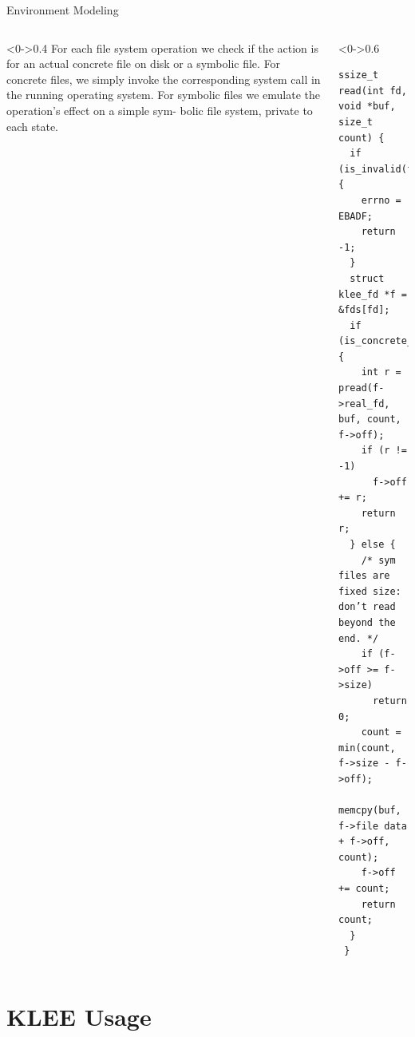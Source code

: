 \documentclass[9pt,aspectratio=43,mathserif,table]{beamer}
\begin{document}
\begin{frame}[fragile]{Environment Modeling}
	\begin{columns}[T]
		\begin{column}<0->{0.4\textwidth}
			For each file system operation we check if the action is
			for an actual concrete file on disk or a symbolic file. For
			concrete files, we simply invoke the corresponding system
			call in the running operating system. For symbolic
			files we emulate the operation’s effect on a simple sym-
			bolic file system, private to each state.
		\end{column}
		\hfill
		\begin{column}<0->{0.6\textwidth}
			\begin{lstlisting}
ssize_t read(int fd, void *buf, size_t count) {
  if (is_invalid(fd)) {
    errno = EBADF;
    return -1;
  }
  struct klee_fd *f = &fds[fd];
  if (is_concrete_file(f)) {
    int r = pread(f->real_fd, buf, count, f->off);
    if (r != -1)
      f->off += r;
    return r;
  } else {
    /* sym files are fixed size: don’t read beyond the end. */
    if (f->off >= f->size)
      return 0;
    count = min(count, f->size - f->off);
    memcpy(buf, f->file data + f->off, count);  
    f->off += count;
    return count;
  }
 }
      \end{lstlisting}
		\end{column}
	\end{columns}
\end{frame}

	

\section{KLEE Usage}
\end{document}
